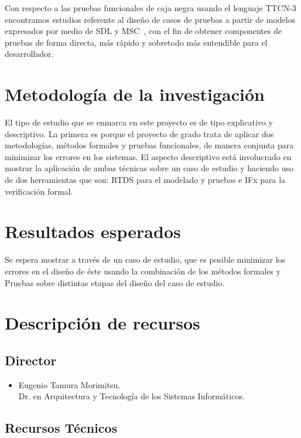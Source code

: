 Con respecto a las pruebas funcionales de caja negra usando el lenguaje TTCN-3 
encontramos estudios referente al dise\~no de casos de pruebas a partir de 
modelos expresados por medio de SDL y MSC~\cite{Ebner, JensGrabowski1999}, con 
el fin de obtener componentes de pruebas de forma directa, m\'as r\'apido y 
sobretodo m\'as entendible para el desarrollador. 


\section{Metodolog\'ia de la investigaci\'on}

El tipo de estudio que se enmarca en este proyecto es de tipo explicativo y 
descriptivo. La primera es porque el proyecto de grado trata de aplicar dos 
metodolog\'ias, m\'etodos formales y pruebas funcionales, de manera conjunta 
para minimizar los errores en los sistemas. El aspecto descriptivo est\'a 
involucrado en mostrar la aplicaci\'on de ambas t\'ecnicas sobre un caso de 
estudio y haciendo uso de dos herramientas que son: RTDS para el modelado y 
pruebas e IFx para la verificaci\'on formal.

\section{Resultados esperados}

Se espera mostrar a trav\'es de un caso de estudio, que es posible minimizar los 
errores en el dise\~no de \'este usando la combinaci\'on de los m\'etodos 
formales y Pruebas sobre distintas etapas del dise\~no del caso de estudio.

\section{Descripci\'on de recursos}

\subsection{Director}

\begin{itemize}
 \item Eugenio Tamura Morimitsu.\\
 Dr. en Arquitectura y Tecnolog\'ia de los Sistemas Inform\'aticos.
 
\end{itemize}

\subsection{Recursos T\'ecnicos}


